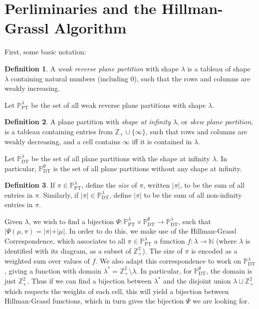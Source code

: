 \documentclass{amsart}
\newcommand{\pt}[1]{\mathbb{P}_\mathrm{PT}^{#1}}
\newcommand{\dt}[1]{\mathbb{P}_\mathrm{DT}^{#1}}
\newcommand{\ZZ}{\mathbb{Z}}
\newcommand{\NN}{\mathbb{N}}
\theoremstyle{definition}
\newtheorem{definition}{Definition}
\begin{document}
\section{Perliminaries and the Hillman-Grassl Algorithm}
First, some basic notation:

\begin{definition}
  A \emph{weak reverse plane partition} with shape $\lambda$ is a
  tableau of shape $\lambda$ containing natural numbers (including 0),
  such that the rows and columns are weakly increasing.
  
  Let $\pt{\lambda}$ be the set of all weak reverse plane partitions
  with shape $\lambda$.
\end{definition}
\begin{definition}
  A plane partition with \emph{shape at infinity} $\lambda$, or
  \emph{skew plane partition}, is a tableau containing entries from
  $\ZZ_+ \cup \{\infty\}$, such that rows and columns are weakly
  decreasing, and a cell contains $\infty$ iff it is contained in
  $\lambda$.
  
  Let $\dt{\lambda}$ be the set of all plane partitions with the shape
  at infinity $\lambda$.  In particular, $\dt{\emptyset}$ is the set of
  all plane partitions without any shape at infinity.
\end{definition}
\begin{definition}
  If $\pi \in \pt{\lambda}$, define the \emph{size} of $\pi$, written
  $|\pi|$, to be the sum of all entries in $\pi$.  Similarly, if
  $|\pi| \in \dt{\lambda}$, define $|\pi|$ to be the sum of all
  non-infinity entries in $\pi$.
\end{definition}

Given $\lambda$, we wish to find a bijection
$\Psi : \pt{\lambda} \times \dt{\emptyset} \to \dt{\lambda}$, such
that $|\Psi(\mu, \pi) = |\pi| + |\mu|$.  In order to do this, we make
use of the Hillman-Grassl Correspondence, which associates to all
$\pi \in \pt{\lambda}$ a function $f : \lambda \to \NN$ (where
$\lambda$ is identified with its diagram, as a subset of $\ZZ_+^2$).
The size of $\pi$ is encoded as a weighted sum over values of $f$.  We
also adapt this correspondence to work on $\dt{\lambda}$, giving a
function with domain $\lambda^* = \ZZ_+^2 \setminus \lambda$.  In
particular, for $\dt{\emptyset}$, the domain is just $\ZZ_+^2$.  Thus
if we can find a bijection between $\lambda^*$ and the disjoint union
$\lambda \sqcup \ZZ_+^2$ which respects the weights of each cell, this
will yield a bijection between Hillman-Grassl functions, which in turn
gives the bijection $\Psi$ we are looking for.
\end{document}
